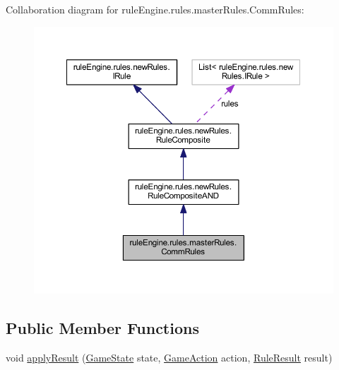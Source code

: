 Collaboration diagram for rule\+Engine.\+rules.\+master\+Rules.\+Comm\+Rules\+:
\nopagebreak
\begin{figure}[H]
\begin{center}
\leavevmode
\includegraphics[width=350pt]{classrule_engine_1_1rules_1_1master_rules_1_1_comm_rules__coll__graph}
\end{center}
\end{figure}
\subsection*{Public Member Functions}
\begin{DoxyCompactItemize}
\item 
void \mbox{\hyperlink{classrule_engine_1_1rules_1_1master_rules_1_1_comm_rules_a57094df71e5c0d9d6e8dd10cf33d23c5}{apply\+Result}} (\mbox{\hyperlink{classgame_1_1game_state_1_1_game_state}{Game\+State}} state, \mbox{\hyperlink{classrule_engine_1_1_game_action}{Game\+Action}} action, \mbox{\hyperlink{classrule_engine_1_1_rule_result}{Rule\+Result}} result)
\end{DoxyCompactItemize}
